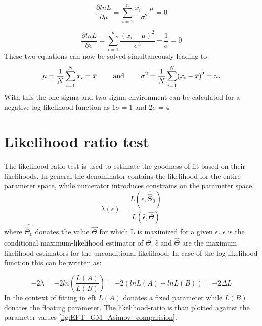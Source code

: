 \documentclass[../Bachelorarbeit.tex]{subfiles}
\begin{document}
\begin{equation}
    \frac{\partial ln L}{\partial \mu} = \sum_{i = 1}^{n} \frac{x_{i}-\mu}{\sigma^{2}} = 0
\end{equation}

\begin{equation}
    \frac{\partial ln L}{\partial \sigma} = \sum_{i = 1}^{n} \frac{(x_{i}-\mu)^{2}}{\sigma^{3}} - \frac{1}{\sigma} = 0
\end{equation}
These two equations can now be solved simultaneously leading to
\begin{equation}
    \mu = \frac{1}{N} \sum^{N}_{i = 1} x_{i} = \overline{x} \qquad \textnormal{ and } \qquad \sigma^{2} = \frac{1}{N} \sum^{N}_{i = 1} (x_{i}-\overline{x})^{2} = n.
\end{equation}
With this the one sigma and two sigma environment can be calculated for a negative log-likelihood function as $1\sigma=1$ and $2\sigma=4$ \cite{Erdmann.2020}
\section{Likelihood ratio test}
The likelihood-ratio test\cite{K.F.RILEY.} is used to estimate the goodness of fit based on their likelihoods. In general the denominator contains the likelihood for the entire parameter space, while numerator introduces constrains on the parameter space.
\begin{equation}
    \lambda(\epsilon) = \frac{L(\epsilon,\hat{\hat{{\Theta}}}_{0})}{L(\hat{\epsilon},\hat{\Theta})}
\end{equation}
where $\hat{\hat{\Theta}_{0}}$ donates the value $\overrightarrow{\Theta}$ for which L is maximized for a given $\epsilon$. $\epsilon$ is the
conditional maximum-likelihood estimator of $\overrightarrow{\Theta}$. $\hat{\epsilon}$ and $\hat{\Theta}$ are the maximum likelihood estimators for the unconditional likelihood.
In case of the log-likelihood function this can be written as:

\begin{equation}
    -2\lambda = -2ln \left( \frac{L(A)}{L(B)}\right)= -2(ln L(A)-ln L(B))=-2 \Delta L
\end{equation}
In the context of fitting in \acrshort{eft} $L(A)$ donates a fixed parameter while $L(B)$ donates the floating parameter. The likelihood-ratio is than plotted against the parameter values  \ref{fig:EFT_GM_Asimov_comparision}.
\end{document}
